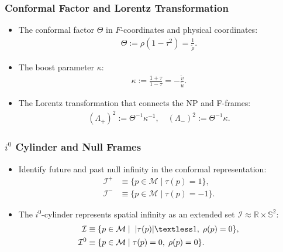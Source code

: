 \documentclass{beamer}
\theoremstyle{remark}
\theoremstyle{plain}
\theoremstyle{plain}
\begin{document}
\begin{frame}
  \frametitle{Conformal Factor and Lorentz Transformation}
  \begin{itemize}
    \item The conformal factor $\Theta$ in $F$-coordinates and physical coordinates:
    \begin{align}
      \Theta := \rho (1-\tau^2) = \frac{1}{\tilde{\rho}}.
    \end{align}
    \item The boost parameter $\kappa$:
    \begin{align}
      \kappa := \frac{1+\tau}{1-\tau} = -\frac{\tilde{v}}{\tilde{u}}.
    \end{align}
    \item The Lorentz transformation that connects the NP and F-frames:
    \begin{align}
      (\Lambda_{+})^{2} := \Theta^{-1}\kappa^{-1}, \quad (\Lambda_{-})^{2} := \Theta^{-1}\kappa.
    \end{align}
  \end{itemize}
\end{frame}

\begin{frame}
  \frametitle{$i^0$ Cylinder and Null Frames}
  \begin{itemize}
    \item Identify future and past null infinity in the conformal representation:
    \begin{align*}
      \mathscr{I}^{+} & \equiv \{ p \in \mathcal{M} \; \rvert\; \tau(p) =1\}, \\
      \mathscr{I}^{-} & \equiv \{ p \in \mathcal{M} \; \rvert \;\tau(p) =-1\}.
    \end{align*}
    \item The $i^0$-cylinder represents spatial infinity as an extended set $\mathcal{I} \approx \mathbb{R}\times \mathbb{S}^2$:
    \begin{align*}
      \mathcal{I} & \equiv \{ p \in \mathcal{M} \; \rvert \;\; |\tau(p)| \textless 1, \;\rho(p)=0\}, \\
      \mathcal{I}^{0} & \equiv \{ p \in \mathcal{M}\; \rvert \;\tau(p)=0, \; \rho(p)=0\}.
    \end{align*}
  \end{itemize}
\end{frame}
\end{document}
